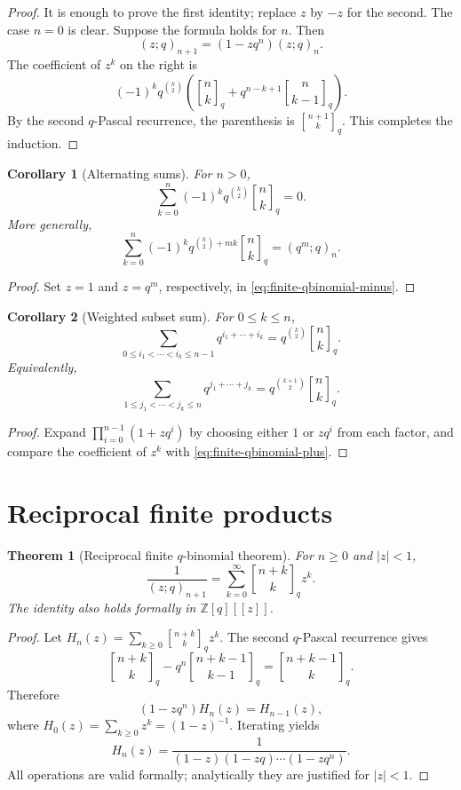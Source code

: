 \documentclass[11pt,oneside,openany]{book}
\newtheorem{theorem}{Theorem}[chapter]
\newtheorem{corollary}[corollary]{Corollary}
\theoremstyle{definition}
\theoremstyle{remark}
\newcommand{\qbinom}[2]{\genfrac{[}{]}{0pt}{}{#1}{#2}_{q}}
\newcommand{\Z}{\mathbb Z}
\newcommand{\abs}[1]{\lvert #1\rvert}
\begin{document}
\begin{proof}
It is enough to prove the first identity; replace $z$ by $-z$ for the second.  The case $n=0$ is clear.  Suppose the formula holds for $n$.  Then
\[
 (z;q)_{n+1}=(1-zq^n)(z;q)_n.
\]
The coefficient of $z^k$ on the right is
\[
 (-1)^kq^{\binom k2}
 \left(\qbinom nk+q^{n-k+1}\qbinom n{k-1}\right).
\]
By the second $q$-Pascal recurrence, the parenthesis is $\qbinom{n+1}k$.  This completes the induction.
\end{proof}

\begin{corollary}[Alternating sums]\label{cor:alternating-qbinom}
For $n>0$,
\[
 \sum_{k=0}^{n}(-1)^kq^{\binom k2}\qbinom nk=0.
\]
More generally,
\[
 \sum_{k=0}^{n}(-1)^kq^{\binom k2+mk}\qbinom nk=(q^m;q)_n.
\]
\end{corollary}

\begin{proof}
Set $z=1$ and $z=q^m$, respectively, in \eqref{eq:finite-qbinomial-minus}.
\end{proof}

\begin{corollary}[Weighted subset sum]\label{cor:weighted-subsets}
For $0\le k\le n$,
\[
 \sum_{0\le i_1<\cdots<i_k\le n-1}q^{i_1+\cdots+i_k}
 =q^{\binom k2}\qbinom nk.
\]
Equivalently,
\[
 \sum_{1\le j_1<\cdots<j_k\le n}q^{j_1+\cdots+j_k}
 =q^{\binom{k+1}{2}}\qbinom nk.
\]
\end{corollary}

\begin{proof}
Expand $\prod_{i=0}^{n-1}(1+zq^i)$ by choosing either $1$ or $zq^i$ from each factor, and compare the coefficient of $z^k$ with \eqref{eq:finite-qbinomial-plus}.
\end{proof}

\section{Reciprocal finite products}

\begin{theorem}[Reciprocal finite $q$-binomial theorem]\label{thm:reciprocal-finite}
For $n\ge0$ and $\abs z<1$,
\[
 \frac{1}{(z;q)_{n+1}}
 =\sum_{k=0}^{\infty}\qbinom{n+k}{k}z^k.
\]
The identity also holds formally in $\Z[q][[z]]$.
\end{theorem}

\begin{proof}
Let
\(
 H_n(z)=\sum_{k\ge0}\qbinom{n+k}{k}z^k.
\)
The second $q$-Pascal recurrence gives
\[
 \qbinom{n+k}{k}-q^n\qbinom{n+k-1}{k-1}
 =\qbinom{n+k-1}{k}.
\]
Therefore
\[
 (1-zq^n)H_n(z)=H_{n-1}(z),
\]
where $H_0(z)=\sum_{k\ge0}z^k=(1-z)^{-1}$.  Iterating yields
\[
 H_n(z)=\frac1{(1-z)(1-zq)\cdots(1-zq^n)}.
\]
All operations are valid formally; analytically they are justified for $\abs z<1$.
\end{proof}
\end{document}
